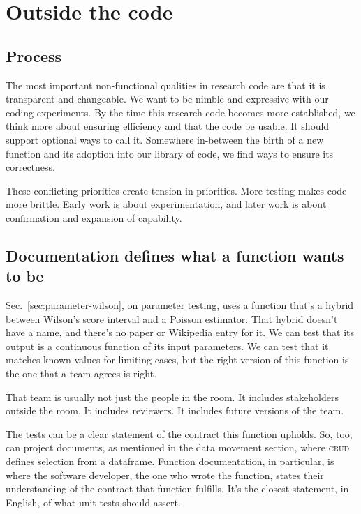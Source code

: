 \documentclass[fleqn,10pt]{olplainarticle}
\begin{document}
\section{Outside the code}\label{sec:outside-code}

\subsection{Process}

The most important non-functional qualities in research code are that it
is transparent and changeable. We want to be nimble and expressive
with our coding experiments. By the time this research code
becomes more established, we think more about ensuring efficiency
and that the code be usable. It should support optional ways to
call it. Somewhere in-between the birth of a new function and its
adoption into our library of code, we find ways to ensure its
correctness.

These conflicting priorities create tension in priorities.
More testing makes code more brittle. Early work is about
experimentation, and later work is about confirmation and
expansion of capability.


\subsection{Documentation defines what a function wants to be}

Sec.~\ref{sec:parameter-wilson}, on parameter testing, uses a function that's a hybrid
between Wilson's score interval and a Poisson estimator. That hybrid
doesn't have a name, and there's no paper or Wikipedia entry for it.
We can test that its output is a continuous function of its input
parameters. We can test that it matches known values for limiting cases,
but the right version of this function is the one that a team agrees
is right.

That team is usually not just the people in the room. It includes stakeholders
outside the room. It includes reviewers. It includes future versions of the team.

The tests can be a clear statement of the contract this function upholds.
So, too, can project documents, as mentioned in the data movement section,
where \textsc{crud} defines selection from a dataframe. 
Function documentation, in particular, is where the software
developer, the one who wrote the function, states their understanding
of the contract that function fulfills. It's the closest statement,
in English, of what unit tests should assert.
\end{document}
